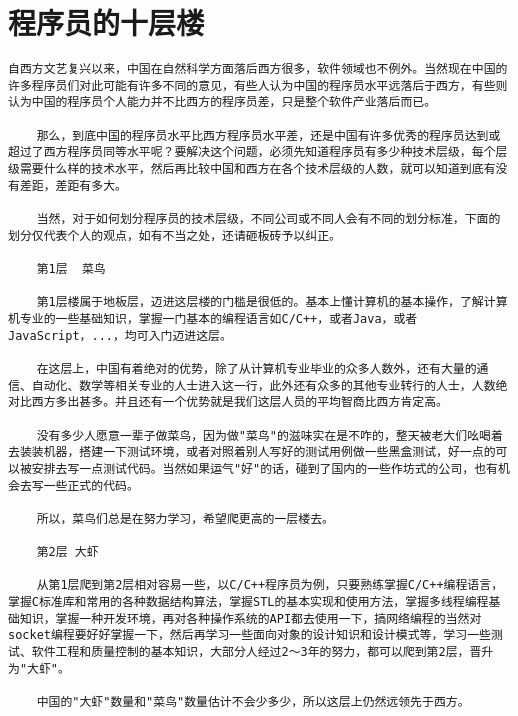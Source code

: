 \section{程序员的十层楼}
\begin{verbatim}
自西方文艺复兴以来，中国在自然科学方面落后西方很多，软件领域也不例外。当然现在中国的许多程序员们对此可能有许多不同的意见，有些人认为中国的程序员水平远落后于西方，有些则认为中国的程序员个人能力并不比西方的程序员差，只是整个软件产业落后而已。

    那么，到底中国的程序员水平比西方程序员水平差，还是中国有许多优秀的程序员达到或超过了西方程序员同等水平呢？要解决这个问题，必须先知道程序员有多少种技术层级，每个层级需要什么样的技术水平，然后再比较中国和西方在各个技术层级的人数，就可以知道到底有没有差距，差距有多大。

    当然，对于如何划分程序员的技术层级，不同公司或不同人会有不同的划分标准，下面的划分仅代表个人的观点，如有不当之处，还请砸板砖予以纠正。

    第1层  菜鸟

    第1层楼属于地板层，迈进这层楼的门槛是很低的。基本上懂计算机的基本操作，了解计算机专业的一些基础知识，掌握一门基本的编程语言如C/C++，或者Java，或者JavaScript，...，均可入门迈进这层。

    在这层上，中国有着绝对的优势，除了从计算机专业毕业的众多人数外，还有大量的通信、自动化、数学等相关专业的人士进入这一行，此外还有众多的其他专业转行的人士，人数绝对比西方多出甚多。并且还有一个优势就是我们这层人员的平均智商比西方肯定高。

    没有多少人愿意一辈子做菜鸟，因为做"菜鸟"的滋味实在是不咋的，整天被老大们吆喝着去装装机器，搭建一下测试环境，或者对照着别人写好的测试用例做一些黑盒测试，好一点的可以被安排去写一点测试代码。当然如果运气"好"的话，碰到了国内的一些作坊式的公司，也有机会去写一些正式的代码。

    所以，菜鸟们总是在努力学习，希望爬更高的一层楼去。

    第2层 大虾

    从第1层爬到第2层相对容易一些，以C/C++程序员为例，只要熟练掌握C/C++编程语言，掌握C标准库和常用的各种数据结构算法，掌握STL的基本实现和使用方法，掌握多线程编程基础知识，掌握一种开发环境，再对各种操作系统的API都去使用一下，搞网络编程的当然对socket编程要好好掌握一下，然后再学习一些面向对象的设计知识和设计模式等，学习一些测试、软件工程和质量控制的基本知识，大部分人经过2～3年的努力，都可以爬到第2层，晋升为"大虾"。

    中国的"大虾"数量和"菜鸟"数量估计不会少多少，所以这层上仍然远领先于西方。


\end{verbatim}

